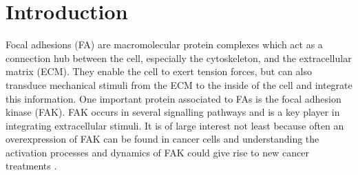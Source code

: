 \chapter{Introduction}
Focal adhesions (FA) are macromolecular protein complexes which act as a connection hub between the cell, especially the cytoskeleton, and the extracellular matrix (ECM). They enable the cell to exert tension forces, but can also transduce mechanical stimuli from the ECM to the inside of the cell and integrate this information. One important protein associated to FAs is the focal adhesion kinase (FAK). FAK occurs in several signalling pathways and is a key player in integrating extracellular stimuli. It is of large interest not least because often an overexpression of FAK can be found in cancer cells and understanding the activation processes and dynamics of FAK could give rise to new cancer treatments \autocite{cancerFAK}.
